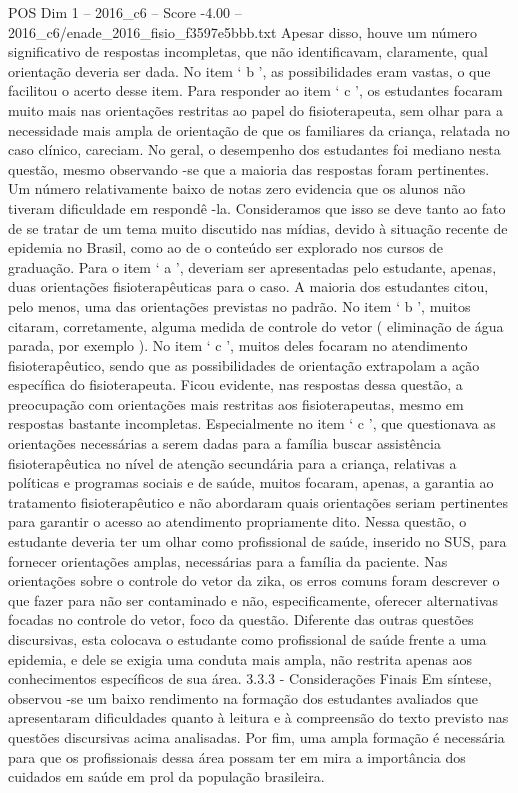 \begin{textsample}{POS Dim 1 – 2016\_c6 – Score -4.00 – 2016\_c6/enade\_2016\_fisio\_f3597e5bbb.txt}
Apesar disso, houve um número significativo de respostas incompletas, que não identificavam, claramente, qual orientação deveria ser dada.
No item ‘ b ’, as possibilidades eram vastas, o que facilitou o acerto desse item.
Para responder ao item ‘ c ’, os estudantes focaram muito mais nas orientações restritas ao papel do fisioterapeuta, sem olhar para a necessidade mais ampla de orientação de que os familiares da criança, relatada no caso clínico, careciam.
No geral, o desempenho dos estudantes foi mediano nesta questão, mesmo observando -se que a maioria das respostas foram pertinentes.
Um número relativamente baixo de notas zero evidencia que os alunos não tiveram dificuldade em respondê -la.
Consideramos que isso se deve tanto ao fato de se tratar de um tema muito discutido nas mídias, devido à situação recente de epidemia no Brasil, como ao de o conteúdo ser explorado nos cursos de graduação.
Para o item ‘ a ’, deveriam ser apresentadas pelo estudante, apenas, duas orientações fisioterapêuticas para o caso.
A maioria dos estudantes citou, pelo menos, uma das orientações previstas no padrão.
No item ‘ b ’, muitos citaram, corretamente, alguma medida de controle do vetor ( eliminação de água parada, por exemplo ).
No item ‘ c ’, muitos deles focaram no atendimento fisioterapêutico, sendo que as possibilidades de orientação extrapolam a ação específica do fisioterapeuta.
Ficou evidente, nas respostas dessa questão, a preocupação com orientações mais restritas aos fisioterapeutas, mesmo em respostas bastante incompletas.
Especialmente no item ‘ c ’, que questionava as orientações necessárias a serem dadas para a família buscar assistência fisioterapêutica no nível de atenção secundária para a criança, relativas a políticas e programas sociais e de saúde, muitos focaram, apenas, a garantia ao tratamento fisioterapêutico e não abordaram quais orientações seriam pertinentes para garantir o acesso ao atendimento propriamente dito.
Nessa questão, o estudante deveria ter um olhar como profissional de saúde, inserido no SUS, para fornecer orientações amplas, necessárias para a família da paciente.
Nas orientações sobre o controle do vetor da zika, os erros comuns foram descrever o que fazer para não ser contaminado e não, especificamente, oferecer alternativas focadas no controle do vetor, foco da questão.
Diferente das outras questões discursivas, esta colocava o estudante como profissional de saúde frente a uma epidemia, e dele se exigia uma conduta mais ampla, não restrita apenas aos conhecimentos específicos de sua área. 3.3.3 - Considerações Finais Em síntese, observou -se um baixo rendimento na formação dos estudantes avaliados que apresentaram dificuldades quanto à leitura e à compreensão do texto previsto nas questões discursivas acima analisadas.
Por fim, uma ampla formação é necessária para que os profissionais dessa área possam ter em mira a importância dos cuidados em saúde em prol da população brasileira.

\end{textsample}
